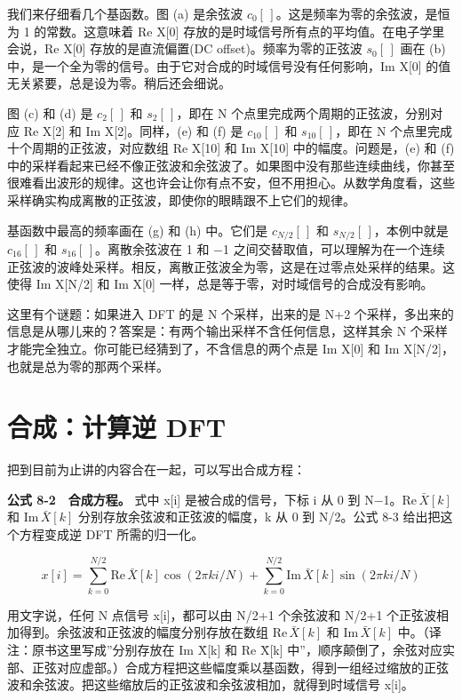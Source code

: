 我们来仔细看几个基函数。图 (a) 是余弦波
\(c_0[\,]\)。这是频率为零的余弦波，是恒为 1 的常数。这意味着 Re X{[}0{]}
存放的是时域信号所有点的平均值。在电子学里会说，Re X{[}0{]}
存放的是直流偏置(DC offset)。频率为零的正弦波 \(s_0[\,]\) 画在 (b)
中，是一个全为零的信号。由于它对合成的时域信号没有任何影响，Im X{[}0{]}
的值无关紧要，总是设为零。稍后还会细说。

图 (c) 和 (d) 是 \(c_2[\,]\) 和 \(s_2[\,]\)，即在 N
个点里完成两个周期的正弦波，分别对应 Re X{[}2{]} 和 Im
X{[}2{]}。同样，(e) 和 (f) 是 \(c_{10}[\,]\) 和 \(s_{10}[\,]\)，即在 N
个点里完成十个周期的正弦波，对应数组 Re X{[}10{]} 和 Im X{[}10{]}
中的幅度。问题是，(e) 和 (f)
中的采样看起来已经不像正弦波和余弦波了。如果图中没有那些连续曲线，你甚至很难看出波形的规律。这也许会让你有点不安，但不用担心。从数学角度看，这些采样确实构成离散的正弦波，即使你的眼睛跟不上它们的规律。

基函数中最高的频率画在 (g) 和 (h) 中。它们是 \(c_{N/2}[\,]\) 和
\(s_{N/2}[\,]\)，本例中就是 \(c_{16}[\,]\) 和
\(s_{16}[\,]\)。离散余弦波在 1 和 −1
之间交替取值，可以理解为在一个连续正弦波的波峰处采样。相反，离散正弦波全为零，这是在过零点处采样的结果。这使得
Im X{[}N/2{]} 和 Im X{[}0{]}
一样，总是等于零，对时域信号的合成没有影响。

这里有个谜题：如果进入 DFT 的是 N 个采样，出来的是 N+2
个采样，多出来的信息是从哪儿来的？答案是：有两个输出采样不含任何信息，这样其余
N 个采样才能完全独立。你可能已经猜到了，不含信息的两个点是 Im X{[}0{]}
和 Im X{[}N/2{]}，也就是总为零的那两个采样。

\section{合成：计算逆 DFT}

把到目前为止讲的内容合在一起，可以写出合成方程：

\textbf{公式 8-2　合成方程。} 式中 x{[}i{]} 是被合成的信号，下标 i 从 0
到 N−1。\(\mathrm{Re}\,\bar{X}[k]\) 和 \(\mathrm{Im}\,\bar{X}[k]\)
分别存放余弦波和正弦波的幅度，k 从 0 到 N/2。公式 8-3
给出把这个方程变成逆 DFT 所需的归一化。

\[
x[i] = \sum_{k=0}^{N/2} \mathrm{Re}\,\bar{X}[k]\cos(2\pi k i/N) + \sum_{k=0}^{N/2} \mathrm{Im}\,\bar{X}[k]\sin(2\pi k i/N)
\]

用文字说，任何 N 点信号 x{[}i{]}，都可以由 N/2+1 个余弦波和 N/2+1
个正弦波相加得到。余弦波和正弦波的幅度分别存放在数组
\(\mathrm{Re}\,\bar{X}[k]\) 和 \(\mathrm{Im}\,\bar{X}[k]\)
中。（译注：原书这里写成''分别存放在 Im X̄{[}k{]} 和 Re X̄{[}k{]}
中''，顺序颠倒了，余弦对应实部、正弦对应虚部。）合成方程把这些幅度乘以基函数，得到一组经过缩放的正弦波和余弦波。把这些缩放后的正弦波和余弦波相加，就得到时域信号
x{[}i{]}。

